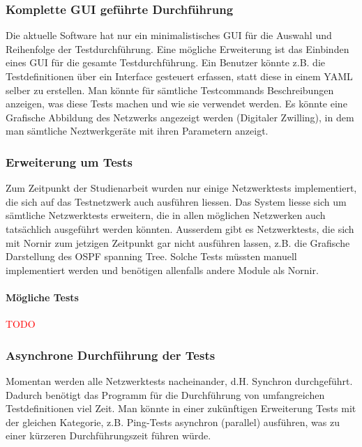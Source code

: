 \documentclass[]{subfiles}
\begin{document}
\subsubsection*{Komplette GUI geführte Durchführung}
Die aktuelle Software hat nur ein minimalistisches GUI für die Auswahl und Reihenfolge
der Testdurchführung. 
Eine mögliche Erweiterung ist das Einbinden eines GUI für die gesamte Testdurchführung.
Ein Benutzer könnte z.B. die Testdefinitionen über ein Interface gesteuert erfassen, 
statt diese in einem YAML selber zu erstellen. 
Man könnte für sämtliche Testcommands Beschreibungen anzeigen, was diese Tests machen
und wie sie verwendet werden. 
Es könnte eine Grafische Abbildung des Netzwerks angezeigt werden (Digitaler Zwilling), 
in dem man sämtliche Neztwerkgeräte mit ihren Parametern anzeigt. 

\subsubsection*{Erweiterung um Tests}
Zum Zeitpunkt der Studienarbeit wurden nur einige Netzwerktests implementiert, die 
sich auf das Testnetzwerk auch ausführen liessen. 
Das System liesse sich um sämtliche Netzwerktests erweitern, die in allen möglichen 
Netzwerken auch tatsächlich ausgeführt werden könnten.
Ausserdem gibt es Netzwerktests, die sich mit Nornir zum jetzigen Zeitpunkt gar nicht
ausführen lassen, z.B. die Grafische Darstellung des OSPF spanning Tree. 
Solche Tests müssten manuell implementiert werden und benötigen allenfalls andere 
Module als Nornir.

\paragraph{Mögliche Tests}
\textcolor{red}{TODO}

\subsubsection*{Asynchrone Durchführung der Tests}
Momentan werden alle Netzwerktests nacheinander, d.H. Synchron durchgeführt.
Dadurch benötigt das Programm für die Durchführung von umfangreichen Testdefinitionen 
viel Zeit.
Man könnte in einer zukünftigen Erweiterung Tests mit der gleichen Kategorie, z.B.
Ping-Tests asynchron (parallel) ausführen, was zu einer kürzeren Durchführungszeit 
führen würde. 
\end{document}
